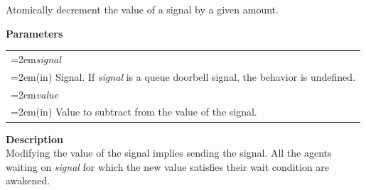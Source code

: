 \documentclass[final]{book}
\newcommand{\hsaarg}[1]{\textit{#1}}
\begin{document}
Atomically decrement the value of a signal by a given amount.

\noindent\textbf{Parameters}\\[-6mm]
\noindent\begin{longtable}{@{}>{\hangindent=2em}p{\textwidth}}
\hsaarg{signal}\\\hspace{2em}(in) Signal. If \textit{signal} is a queue doorbell signal, the behavior is undefined.\\[2mm]
\hsaarg{value}\\\hspace{2em}(in) Value to subtract from the value of the signal.
\end{longtable}
\noindent\textbf{Description}\\[1mm]
Modifying the value of the signal implies sending the signal. All the agents waiting on \textit{signal} for which the new value satisfies their wait condition are awakened. 
\end{document}
